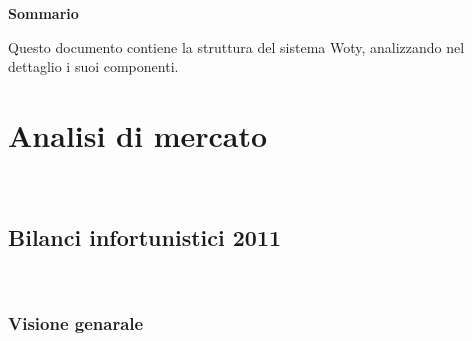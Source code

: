 
\newpage

\vspace*{0.5cm} %
\begin{center}

\textbf{{\huge{Sommario}}}

Questo documento contiene la struttura del sistema Woty, analizzando nel dettaglio i suoi componenti.

\vspace*{0.2cm} %

\end{center}






\newpage

\tableofcontents %

\let\cleardoublepage\clearpage %

\listoftables

\listoffigures




\newpage
\section{Analisi di mercato}


\ \ \
\subsection{Bilanci infortunistici 2011}

\ \
\subsubsection{Visione genarale}

